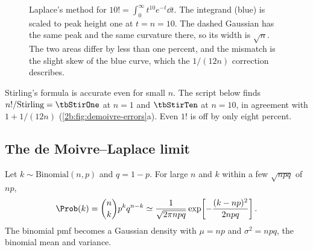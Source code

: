 \begin{figure}[htbp]
\centering
{}
\caption{Laplace's method for $10!=\int_0^\infty t^{10}e^{-t}\dd t$. The integrand (blue) is scaled to peak height one at $t=n=10$. The dashed Gaussian has the same peak and the same curvature there, so its width is $\sqrt n$. The two areas differ by less than one percent, and the mismatch is the slight skew of the blue curve, which the $1/(12n)$ correction describes.}
\label{2b:fig:laplace}
\end{figure}

Stirling's formula is accurate even for small $n$. The script below finds $n!/\text{Stirling}=\tbStirOne$ at $n=1$ and $\tbStirTen$ at $n=10$, in agreement with $1+1/(12n)$ (\cref{2b:fig:demoivre-errors}a). Even $1!$ is off by only eight percent.

\subsection{The de Moivre--Laplace limit}
\label{2b:sec:demoivre}

\begin{keyidea}
Let $k\sim\text{Binomial}(n,p)$ and $q=1-p$. For large $n$ and $k$ within a few $\sqrt{npq}$ of $np$,
\begin{equation}
  \Prob(k)=\binom nk p^kq^{n-k}\simeq \frac{1}{\sqrt{2\pi npq}}\exp\!\left[-\frac{(k-np)^2}{2npq}\right].
  \label{2b:eq:dml}
\end{equation}
The binomial pmf becomes a Gaussian density with $\mu=np$ and $\sigma^2=npq$, the binomial mean and variance.
\end{keyidea}

